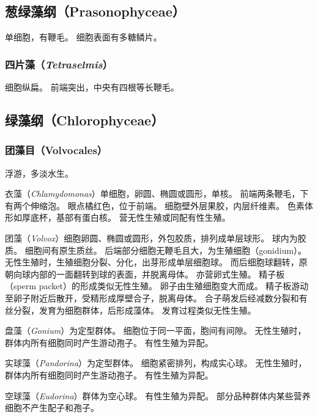\documentclass[11pt]{article}
\begin{document}
\subsection{葱绿藻纲（Prasonophyceae）}
单细胞，有鞭毛。
细胞表面有多糖鳞片。

\subsubsection{四片藻（\textit{Tetraselmis}）}
细胞纵扁。
前端突出，中央有四根等长鞭毛。

\subsection{绿藻纲（Chlorophyceae）}
\subsubsection{团藻目（Volvocales）}
浮游，多淡水生。

\par

衣藻（\textit{Chlamydomonas}）单细胞，卵圆、椭圆或圆形，单核。
前端两条鞭毛，下有两个伸缩泡。
眼点橘红色，位于前端。
细胞壁外层果胶，内层纤维素。
色素体形如厚底杯，基部有蛋白核。
营无性生殖或同配有性生殖。

\par

团藻（\textit{Volvox}）细胞卵圆、椭圆或圆形，外包胶质，排列成单层球形。
球内为胶质。
细胞间有原生质丝。
后端部分细胞无鞭毛且大，为生殖细胞（gonidium）。
无性生殖时，生殖细胞分裂、分化，出芽形成单层细胞球。
而后细胞球翻转，原朝向球内部的一面翻转到球的表面，并脱离母体。
亦营卵式生殖。
精子板（sperm packet）的形成类似无性生殖。
卵子由生殖细胞变大而成。
精子板游动至卵子附近后散开，受精形成厚壁合子，脱离母体。
合子萌发后经减数分裂和有丝分裂，发育为细胞群体，后形成藻体。
发育过程类似无性生殖。

\par

盘藻（\textit{Gonium}）为定型群体。
细胞位于同一平面，胞间有间隙。
无性生殖时，群体内所有细胞同时产生游动孢子。
有性生殖为异配。

\par

实球藻（\textit{Pandorina}）为定型群体。
细胞紧密排列，构成实心球。
无性生殖时，群体内所有细胞同时产生游动孢子。
有性生殖为异配。

\par

空球藻（\textit{Eudorina}）群体为空心球。
有性生殖为异配。
部分品种群体内某些营养细胞不产生配子和孢子。
\end{document}
